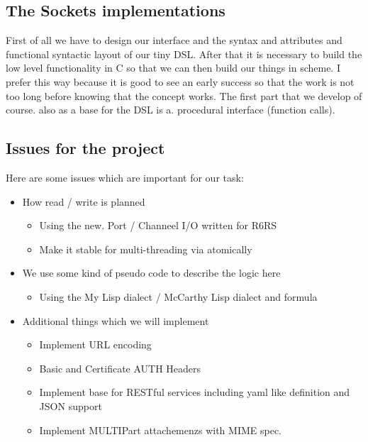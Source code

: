 \documentclass[10pt,a4paper,english]{article}
\begin{document}
\begin{multicols}{2}
\subsection{The Sockets implementations }
\begin{flushleft}
First of all we have to design our interface and the syntax and attributes and functional syntactic layout of our tiny DSL. After that it is necessary to build the low level functionality in C so that we can then build our things in scheme. I prefer this way because it is good to see an early success so that the work is not too long before knowing that the concept works. The first part that we develop of course. also as a base for the DSL is a. procedural interface (function calls).
\end{flushleft}
\subsection{Issues for the project}
\begin{flushleft}
Here are some issues  which are important for our task:
 \begin{itemize}
 \item{How read / write is planned}
    \begin{itemize}
        \item{Using the new. Port / Channeel I/O written for R6RS}
        \item{Make it stable for multi-threading via atomically}        
    \end{itemize}
\item{We use some kind of pseudo code to describe the logic here}
   \begin{itemize}
        \item{Using the My Lisp dialect / McCarthy Lisp dialect and formula}
    \end{itemize}
\item{Additional things which we will implement}
    \begin{itemize}
       \item{Implement URL encoding}
       \item{Basic and Certificate AUTH Headers} 
       \item{Implement base for RESTful services including yaml like definition and JSON support}
       \item{Implement MULTIPart attachemenzs with MIME spec.}
   \end{itemize}
\end{itemize}
\end{flushleft}



\end{multicols}
\end{document}
